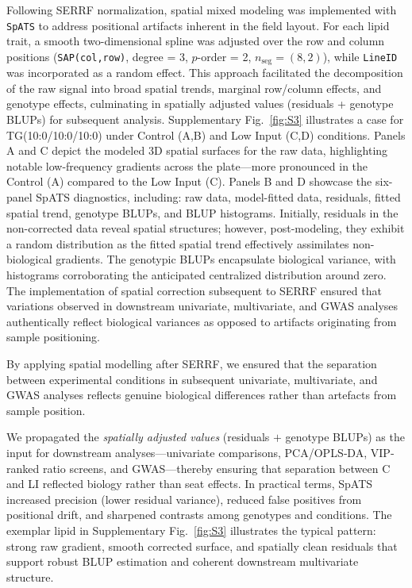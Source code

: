 \documentclass[10pt,letterpaper]{article}
\begin{document}
Following SERRF normalization, spatial mixed modeling was implemented with \texttt{SpATS} to address positional artifacts inherent in the field layout. For each lipid trait, a smooth two-dimensional spline was adjusted over the row and column positions (\texttt{SAP(col,row)}, degree = 3, $p$-order = 2, $n_{\mathrm{seg}}=(8,2)$), while \texttt{LineID} was incorporated as a random effect. This approach facilitated the decomposition of the raw signal into broad spatial trends, marginal row/column effects, and genotype effects, culminating in spatially adjusted values (residuals + genotype BLUPs) for subsequent analysis. Supplementary Fig.~\ref{fig:S3} illustrates a case for TG(10:0/10:0/10:0) under Control (A,B) and Low Input (C,D) conditions. Panels A and C depict the modeled 3D spatial surfaces for the raw data, highlighting notable low-frequency gradients across the plate—more pronounced in the Control (A) compared to the Low Input (C). Panels B and D showcase the six-panel SpATS diagnostics, including: raw data, model-fitted data, residuals, fitted spatial trend, genotype BLUPs, and BLUP histograms. Initially, residuals in the non-corrected data reveal spatial structures; however, post-modeling, they exhibit a random distribution as the fitted spatial trend effectively assimilates non-biological gradients. The genotypic BLUPs encapsulate biological variance, with histograms corroborating the anticipated centralized distribution around zero. The implementation of spatial correction subsequent to SERRF ensured that variations observed in downstream univariate, multivariate, and GWAS analyses authentically reflect biological variances as opposed to artifacts originating from sample positioning.

By applying spatial modelling after SERRF, we ensured that the separation between experimental conditions in subsequent univariate, multivariate, and GWAS analyses reflects genuine biological differences rather than artefacts from sample position.

We propagated the \emph{spatially adjusted values} (residuals $+$ genotype BLUPs) as the input for downstream analyses—univariate comparisons, PCA/OPLS‐DA, VIP‐ranked ratio screens, and GWAS—thereby ensuring that separation between C and LI reflected biology rather than seat effects. In practical terms, SpATS increased precision (lower residual variance), reduced false positives from positional drift, and sharpened contrasts among genotypes and conditions. The exemplar lipid in Supplementary Fig.~\ref{fig:S3} illustrates the typical pattern: strong raw gradient, smooth corrected surface, and spatially clean residuals that support robust BLUP estimation and coherent downstream multivariate structure.
\end{document}
